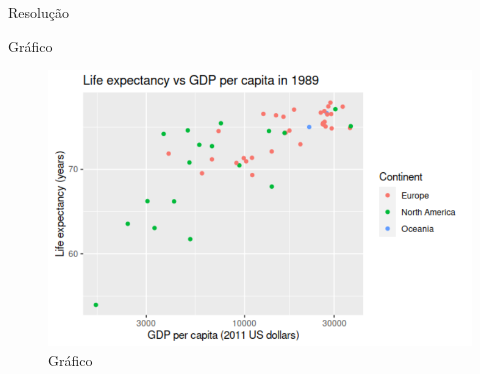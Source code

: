 \documentclass{article}
\begin{document}
\huge{\sffamily \color{blue}Resolução}
\lstset{style=mystyle}


\huge{\sffamily \color{blue}Gráfico}


\begin{figure}[h] %
    \centering %
    \includegraphics[width=1\textwidth]{files/graph.png} %
    \caption{Gráfico} %
    \label{fig:graph} %
\end{figure}
\end{document}
